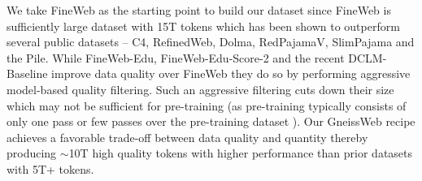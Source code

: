 We take FineWeb \cite{penedo2024fineweb} as the starting point to build our dataset since FineWeb is sufficiently large dataset with 15T tokens which has been shown to outperform several public datasets -- C4, RefinedWeb, Dolma, RedPajamaV, SlimPajama and the Pile.
While FineWeb-Edu, FineWeb-Edu-Score-2 \cite{penedo2024fineweb} and the recent DCLM-Baseline \cite{li2024datacomplm} improve data quality over FineWeb they do so by performing aggressive model-based quality filtering. Such an aggressive filtering cuts down their size which may not be sufficient for pre-training (as pre-training typically consists of only one pass or few passes over the pre-training dataset \cite{muennighoff2023scaling}). Our GneissWeb recipe achieves a favorable trade-off between data quality and quantity thereby producing $\sim$10T high quality tokens with higher performance than prior datasets with 5T+ tokens.  





